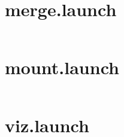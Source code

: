 \section{merge.launch}
\label{Appdix:merge.launch}
\inputminted{xml}{ros_system/launch/src/sublaunch/merge.launch}

\section{mount.launch}
\label{Appdix:mount.launch}
\inputminted{xml}{ros_system/launch/src/sublaunch/mount.launch}

\section{viz.launch}
\label{Appdix:viz.launch}
\inputminted{xml}{ros_system/launch/src/sublaunch/viz.launch}

